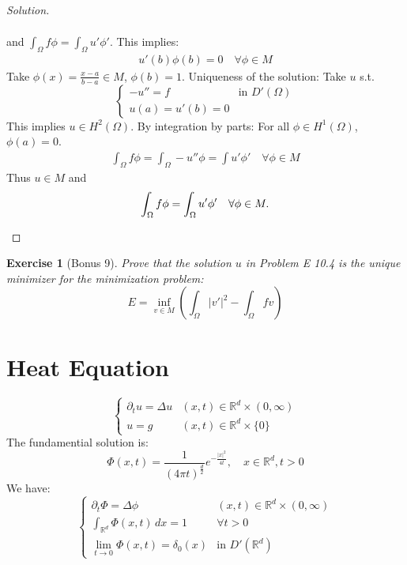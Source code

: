 \documentclass{report}
\theoremstyle{tommy}
\newtheorem{ex}[defn]{Exercise}
\begin{document}
\begin{proof}[Solution]
\begin{enumerate}[label=\alph*)]
\begin{align*}
      \end{align*}
      and \(\int_\Omega f \phi = \int_\Omega u' \phi'\). This implies:
      \begin{align*}
        u'(b) \phi(b) = 0 \quad \forall \phi \in M
      \end{align*}
      Take \(\phi(x) = \frac{x-a}{b-a} \in M\), \(\phi(b) = 1\).
      Uniqueness of the solution: Take \(u \) s.t. 
      \[\begin{cases}
        - u'' = f &\text{in } D'(\Omega) \\ u(a) = u'(b) = 0
      \end{cases}\]
      This implies \(u \in H^2(\Omega)\). By integration by parts: For all \(\phi \in H^1(\Omega)\), \(\phi(a) = 0\).
      \begin{align*}
        \int_\Omega f \phi = \int_\Omega-u''\phi = \int u' \phi' \quad \forall \phi \in M
      \end{align*}
      Thus \(u \in M\) and 
      \[\int_\Omega f \phi = \int_\Omega u' \phi' \quad \forall \phi \in M. \qedhere\]
    \end{enumerate}
  \end{proof}

  \begin{ex}[Bonus 9]
    Prove that the solution \(u\) in Problem E 10.4 is the unique minimizer for the minimization problem:
    \[E = \inf_{v \in M} \left(\int_\Omega |v'|^2 - \int_\Omega f v\right)\]
  \end{ex}

  \chapter{Heat Equation}
  \[
    \begin{cases}
      \partial_t u = \Delta u &(x,t) \in \mathbb{R}^d \times (0, \infty) \\
      u=g &(x,t) \in \mathbb{R}^d \times \{0\}
    \end{cases}
  \]
  The fundamential solution is:
  \[
    \Phi(x,t) = \frac{1}{(4 \pi t)^{\frac{d}{2}}} e^{-\frac{|x|^2}{4t}}, \quad x \in \mathbb{R}^d, t > 0
  \]
  We have:
  \[
    \begin{cases}
      \partial_t \Phi = \Delta \phi &(x,t) \in \mathbb{R}^d \times (0,\infty) \\
      \int_{\mathbb{R}^d} \Phi(x,t) \, dx = 1 & \forall t > 0 \\
      \lim_{t \to 0} \Phi(x,t) = \delta_0(x) & \text{in } D'(\mathbb{R}^d)
    \end{cases}
  \]
\end{document}
